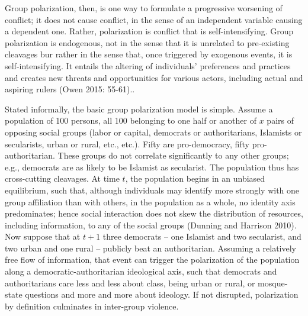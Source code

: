 \documentclass[12pt]{article}
\begin{document}
Group polarization, then, is one way to formulate a progressive worsening of conflict; it does not cause conflict, in the sense of an independent variable causing a dependent one.  Rather, polarization is conflict that is self-intensifying.  Group polarization is endogenous, not in the sense that it is unrelated to pre-existing cleavages bur rather in the sense that, once triggered by exogenous events, it is self-intensifying.   It entails the altering of individuals' preferences and practices and creates new threats and opportunities for various actors, including actual and aspiring rulers (Owen 2015: 55-61)..  

Stated informally, the basic group polarization model is simple.  Assume a population of 100 persons, all 100 belonging to one half or another of $x$ pairs of opposing social groups (labor or capital, democrats or authoritarians, Islamists or secularists, urban or rural, etc., etc.).  Fifty are pro-democracy, fifty pro-authoritarian.  These groups do not correlate significantly to any other groups; e.g., democrats are as likely to be Islamist as secularist.  The population thus has cross-cutting cleavages.   At time $t$, the population begins in an unbiased equilibrium, such that, although individuals may identify more strongly with one group affiliation than with others, in the population as a whole, no identity axis predominates; hence social interaction does not skew the distribution of resources, including information, to any of the social groups (Dunning and Harrison 2010).  Now suppose that at $t+1$ three democrats – one Islamist and two secularist, and two urban and one rural – publicly beat an authoritarian.  Assuming a relatively free flow of information, that event can trigger the polarization of the population along a democratic-authoritarian ideological axis, such that democrats and authoritarians care less and less about class, being urban or rural, or mosque-state questions and more and more about ideology.  If not disrupted, polarization by definition culminates in inter-group violence.
\end{document}
